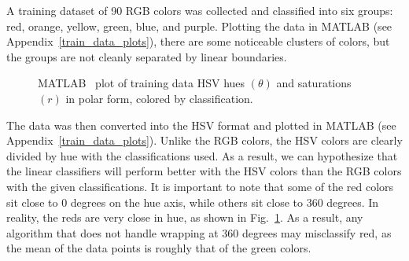 \documentclass[twoside]{IEEEtran}
\begin{document}
A training dataset of 90 RGB colors was collected and classified into six groups: red, orange,
yellow, green, blue, and purple. Plotting the data in MATLAB (see Appendix~\ref{train_data_plots}), there are
some noticeable clusters of colors, but the groups are not cleanly separated by linear boundaries.

\begin{figure}[!t]
    \centering
    \hfil
    \caption{MATLAB~\cite{matlab} plot of training data HSV hues \( \left(\theta\right) \) and saturations \( \left(r\right) \) in polar form, colored by classification.}%
    \label{hsv_polar}
\end{figure}

The data was then converted into the HSV format and plotted in MATLAB (see Appendix~\ref{train_data_plots}).
Unlike the RGB colors, the HSV colors are clearly divided by hue with the classifications
used. As a result, we can hypothesize that the linear classifiers will perform better with the HSV
colors than the RGB colors with the given classifications. It is important to note that some of the
red colors sit close to 0 degrees on the hue axis, while others sit close to 360 degrees. In reality,
the reds are very close in hue, as shown in Fig.~\ref{hsv_polar}. As a result, any algorithm that does not
handle wrapping at 360 degrees may misclassify red, as the mean of the data points is roughly
that of the green colors.
\end{document}
